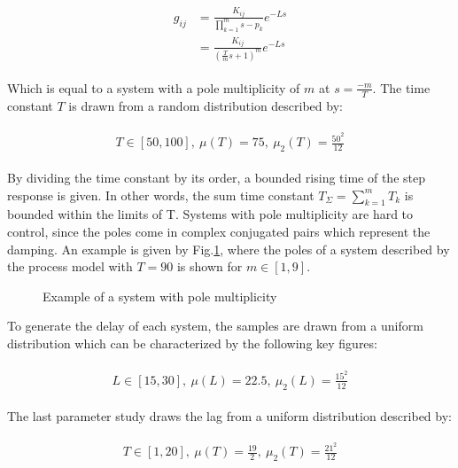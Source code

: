 \begin{align*}
\begin{split}
g_{ij} &= \frac{K_{ij}}{\prod_{k=1}^{m} s - p_k} e^{-Ls} \\
&= \frac{K_{ij}}{\left( \frac{T}{m}s+1\right)^m} e^{-Ls}
\end{split}
\end{align*}
 
Which is equal to a system with a pole multiplicity of $m$ at $s = \frac{-m}{T}$. The time constant $T$ is drawn from a random distribution described by:

\begin{align*}
\begin{split}
T \in \left[ 50 , 100 \right],~\mu\left( T \right) = 75,~\mu_2\left(T\right) = \frac{50^2}{12}
\end{split}
\end{align*}

By dividing the time constant by its order, a bounded rising time of the step response is given. In other words, the sum time constant $T_\Sigma = \sum_{k=1}^m T_k$ is bounded within the limits of T.
Systems with pole multiplicity are hard to control, since the poles come in complex conjugated pairs which represent the damping. An example is given by Fig.\ref{c:montecarlo:f:pole_example}, where the poles of a system described by the process model with $T=90$ is shown for $m\in \left[1,9\right]$.

\begin{figure}[h]\centering

\caption{Example of a system with pole multiplicity}
\label{c:montecarlo:f:pole_example}
\end{figure}

To generate the delay of each system, the samples are drawn from a uniform distribution which can be characterized by the following key figures:

\begin{align*}
\begin{split}
L \in \left[ 15 , 30 \right],~\mu\left( L \right) = 22.5 ,~\mu_2\left(L\right) = \frac{15^2}{12}
\end{split}
\end{align*}


The last parameter study draws the lag from a uniform distribution described by:

\begin{align*}
\begin{split}
T \in \left[ 1 , 20 \right],~\mu\left( T \right) = \frac{19}{2},~\mu_2\left(T\right) = \frac{21^2}{12}
\end{split}
\end{align*}

